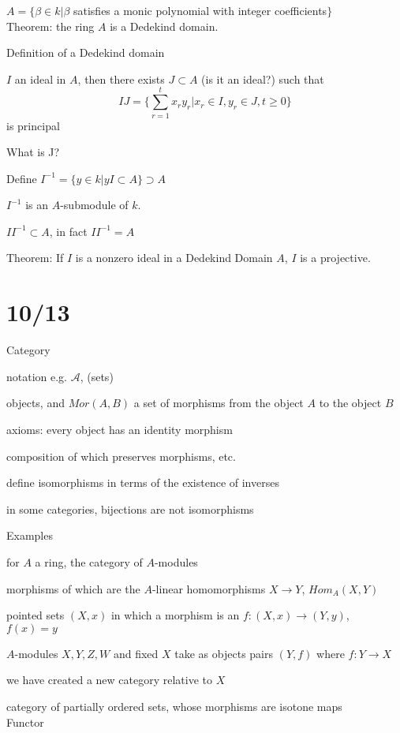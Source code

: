 \documentclass[12pt]{article}
\newcommand{\inv}{^{-1}}
\begin{document}
\noindent
$A = \{\beta \in k| \beta$ satisfies a monic polynomial with integer coefficients$\}$\\

\noindent
Theorem: the ring $A$ is a Dedekind domain.

\noindent
Definition of a Dedekind domain

$I$ an ideal in $A$, then there exists $J \subset A$ (is it an ideal?) such that$$IJ = \{\sum_{r = 1}^t x_r y_r | x_r \in I, y_r \in J, t \geq 0\}$$ is principal

What is J?

Define $I\inv = \{y \in k | yI \subset A\} \supset A$

$I\inv$ is an $A$-submodule of $k$.

$II\inv \subset A$, in fact $II\inv = A$

\noindent
Theorem: If $I$ is a nonzero ideal in a Dedekind Domain $A$, $I$ is a projective.

\section{10/13}

Category

notation e.g. $\mathcal{A}$, (sets)

objects, and $Mor(A, B)$ a set of morphisms from the object $A$ to the object $B$

axioms: every object has an identity morphism

composition of which preserves morphisms, etc.

define isomorphisms in terms of the existence of inverses

in some categories, bijections are not isomorphisms

\noindent
Examples

for $A$ a ring, the category of $A$-modules

morphisms of which are the $A$-linear homomorphisms $X \to Y$, $Hom_A(X, Y)$

pointed sets $(X, x)$ in which a morphism is an $f:(X, x) \to (Y, y)$, $f(x) = y$

$A$-modules $X, Y, Z, W$ and fixed $X$ take as objects pairs $(Y, f)$ where $f: Y \to X$

we have created a new category relative to $X$

category of partially ordered sets, whose morphisms are isotone maps\\

\noindent
Functor
\end{document}
